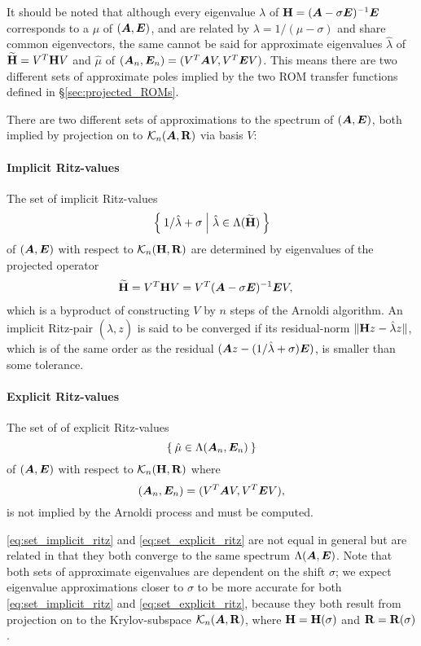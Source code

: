 It should be noted that although every eigenvalue $\lambda$ of $\textbf{\textup{H}} = (\bm{A} - \sigma \bm{E})^{-1}\bm{E}$ corresponds to a  $\mu$ of $(\bm{A},\bm{E})$, and are related by $\lambda = 1 /(\mu-\sigma)$ and share common eigenvectors, the same cannot be said for approximate eigenvalues $\hat{\lambda}$ of $\widetilde{\textbf{\textup{H}}}=V^T \textbf{\textup{H}} V$ and $\hat{\mu}$ of $(\bm{A}_n, \bm{E}_n) = (V^T\bm{A} V, V^T \bm{E} V)$.   This means there are two different sets of approximate poles implied by the two ROM transfer functions defined in \S\ref{sec:projected_ROMs}.

There are two different sets of approximations to the spectrum of $(\bm{A},\bm{E})$, both implied by projection on to $\mathcal{K}_{n}({\bm{A}},{\textbf{\textup{R}}})$ via basis $V$:
\paragraph{Implicit Ritz-values}
The set of implicit Ritz-values
\begin{equation}
\Set{1/\hat{\lambda}+\sigma | \hat{\lambda}\in\Lambda(\widetilde{\textbf{\textup{H}}})}
\label{eq:set_implicit_ritz}
\end{equation}
 of $(\bm{A},\bm{E})$ with respect to $\mathcal{K}_{n}({\textbf{\textup{H}}},{\textbf{\textup{R}}})$ are determined by eigenvalues of the projected operator
\begin{align*}
\widetilde{\textbf{\textup{H}}} = V^T \textbf{\textup{H}} V &= V^T (\bm{A} - \sigma \bm{E})^{-1}\bm{E} V,
\end{align*}
which is a byproduct of constructing $V$ by $n$ steps of the Arnoldi algorithm.  An implicit Ritz-pair $(\hat{\lambda}, z)$ is said to be converged if its residual-norm 
$\| \textbf{\textup{H}} z - \hat{\lambda} z \|$,
 which is of the same order as the residual $(\bm{A} z - (1/\hat{\lambda}+\sigma) \bm{E})$, is smaller than some tolerance.  

\paragraph{Explicit Ritz-values}
The set of of explicit Ritz-values
\begin{equation}
\Set{\hat{\mu}\in\Lambda(\bm{A}_n,\bm{E}_n)}
\label{eq:set_explicit_ritz}
\end{equation}
 of $(\bm{A},\bm{E})$ with respect to $\mathcal{K}_{n}({\textbf{\textup{H}}},{\textbf{\textup{R}}})$ where  
\[
(\bm{A}_n,\bm{E}_n)= (V^T \bm{A} V, V^T \bm{E} V),
\]
is not implied by the Arnoldi process and must be computed.  



 \eqref{eq:set_implicit_ritz} and \eqref{eq:set_explicit_ritz} are not equal in general but are related in that they both converge to the same spectrum $\Lambda(\bm{A},\bm{E})$.  Note that both sets of approximate eigenvalues are dependent on the shift $\sigma$; we expect eigenvalue approximations closer to $\sigma$ to be more accurate for both \eqref{eq:set_implicit_ritz} and \eqref{eq:set_explicit_ritz}, because they both result from projection on to the Krylov-subspace $\mathcal{K}_{n}({\bm{A}},{\textbf{\textup{R}}})$, where $\textbf{\textup{H}}=\textbf{\textup{H}}(\sigma)$ and $\textbf{\textup{R}}=\textbf{\textup{R}}(\sigma)$.

